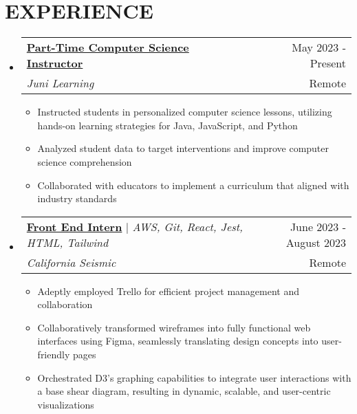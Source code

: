 \documentclass[a4paper,11pt]{article}
\makeatletter
\newcommand{\myuline}[1]{%
  \uline{#1}%
}
\newcommand{\resumeItem}[1]{
  \item\small{
    {#1 \vspace{-3pt}}
  }
}
\newcommand{\resumeSubheading}[4]{
  \vspace{-2pt}\item
    \begin{tabular*}{0.97\textwidth}[t]{l@{\extracolsep{\fill}}r}
      \textbf{#1} & #2 \\
      \textit{\small#3} & \textnormal{\small #4} \\
    \end{tabular*}\vspace{-8pt}
}
\newcommand{\resumeHeadingT}[4]{ %
    \vspace{-2pt} %
    \item
    \begin{tabular*}{0.97\textwidth}{l@{\extracolsep{\fill}}r}
      \small#1 & #2 \\
      \textit{\small#3} & \textnormal{\small #4} \\
    \end{tabular*} \vspace{-15.6pt} %
}
\newcommand{\resumeProjectHeading}[2]{
    \vspace{-2pt} %
    \item
    \begin{tabular*}{0.97\textwidth}{l@{\extracolsep{\fill}}r}
      \small#1 & #2 \\
    \end{tabular*} \vspace{-15.6pt} %
}
\newcommand{\resumeSubHeadingListStart}{\begin{itemize}[leftmargin=0.15in, label={}]}
\newcommand{\resumeSubHeadingListEnd}{\end{itemize}}
\newcommand{\resumeItemListStart}{\begin{itemize}}
\newcommand{\resumeItemListEnd}{\end{itemize}\vspace{-6pt}} %
\makeatother
\begin{document}
\section{ \textbf{EXPERIENCE}}
    \resumeSubHeadingListStart
    \resumeSubheading
      {\myuline{\textbf{Part-Time Computer Science Instructor}}}{May 2023 - Present}
      {Juni Learning}{Remote}
      \resumeItemListStart
            \resumeItem{Instructed students in personalized computer science lessons, utilizing hands-on learning strategies for Java, JavaScript, and Python}
            \resumeItem{Analyzed student data to target interventions and improve computer science comprehension}
            \resumeItem{Collaborated with educators to implement a curriculum that aligned with industry standards}
          \resumeItemListEnd
      \resumeHeadingT
      {{\myuline{\textbf{Front End Intern}}} $|$ \textit{AWS, Git, React, Jest, HTML, Tailwind}}{June 2023 - August 2023}
      {California Seismic}{Remote}
      \resumeItemListStart
            \resumeItem{Adeptly employed Trello for efficient project management and collaboration}
            \resumeItem{Collaboratively transformed wireframes into fully functional web interfaces using Figma, seamlessly translating design concepts into user-friendly pages}
            \resumeItem{Orchestrated D3's graphing capabilities to integrate user interactions with a base shear diagram, resulting in dynamic, scalable, and user-centric visualizations}
          \resumeItemListEnd
          \resumeSubHeadingListEnd 
          
\end{document}
